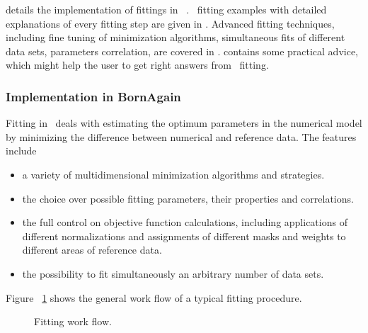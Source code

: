  details the
implementation of fittings in \BornAgain\ . 
\Python\ fitting examples with detailed
explanations of every fitting step are given in . Advanced fitting techniques, including fine tuning of minimization
algorithms, simultaneous fits of different data sets, parameters
correlation, are covered in
.  contains some practical advice, which might
help the user to get right answers from \BornAgain\ fitting.


\subsubsection{Implementation in BornAgain} 

Fitting in  \BornAgain\ deals with estimating the optimum parameters
in the numerical model by minimizing the difference between
numerical and reference data.
The features include 

\begin{itemize}
\item a variety of multidimensional minimization algorithms and strategies.
\item the choice over possible fitting parameters, their properties and correlations.
\item the full control on objective function calculations, including applications of different normalizations and assignments of different masks and weights to different areas of reference data.
\item the possibility to fit simultaneously an arbitrary number of data sets.
\end{itemize}

Figure ~\ref{fig:minimization_workflow} shows the general work flow of a typical fitting procedure.
\begin{figure}[htbp]
\centering
\caption{
Fitting work flow.
}
\label{fig:minimization_workflow}
\end{figure}

